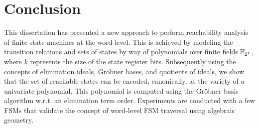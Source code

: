 
\section{Conclusion} \label{sec:conc}
This dissertation has presented a new approach to perform reachability
analysis of finite state machines at the word-level. This is achieved
by modeling the transition relations and sets of states by way of
polynomials over finite fields ${\mathbb{F}}_{2^k}$, where $k$ represents the size
of the state register bits. Subsequently using the concepts of
elimination ideals, Gr\"obner bases, and quotients of ideals, we show
that the set of reachable states can be encoded, canonically, as the
variety of a univariate polynomial. This polynomial is computed using
the Gr\"obner basis algorithm w.r.t. an elimination term
order. Experiments are conducted with a few FSMs that validate the
concept of word-level FSM traversal using algebraic geometry. 
